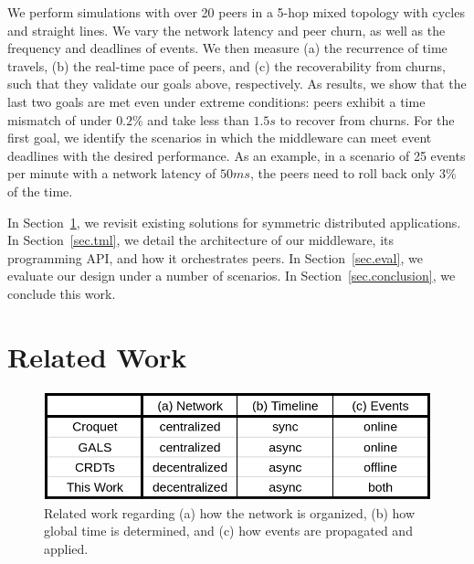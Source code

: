 \documentclass[fleqn,10pt]{SelfArx}
\begin{document}
We perform simulations with over 20 peers in a 5-hop mixed topology with cycles
and straight lines.
We vary the network latency and peer churn, as well as the frequency and
deadlines of events.
%
We then measure (a) the recurrence of time travels, (b) the real-time pace of
peers, and (c) the recoverability from churns, such that they validate our
goals above, respectively.
%
As results, we show that the last two goals are met even under extreme
conditions: peers exhibit a time mismatch of under $0.2\%$ and take less than
$1.5s$ to recover from churns.
%
For the first goal, we identify the scenarios in which the middleware can meet
event deadlines with the desired performance.
As an example, in a scenario of 25 events per minute with a network latency of
$50ms$, the peers need to roll back only $3\%$ of the time.

In Section~\ref{sec.related}, we revisit existing solutions for symmetric
distributed applications.
In Section~\ref{sec.tml}, we detail the architecture of our middleware, its
programming API, and how it orchestrates peers.
In Section~\ref{sec.eval}, we evaluate our design under a number of scenarios.
In Section~\ref{sec.conclusion}, we conclude this work.

\section{Related Work}
\label{sec.related}

\begin{figure}
  \centering
  \includegraphics[width=\linewidth]{table}
  \caption{
    Related work regarding
        (a) how the network is organized,
        (b) how global time is determined, and
        (c) how events are propagated and applied.
    \label{fig.table}
  }
\end{figure}
\end{document}
